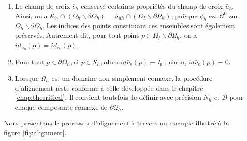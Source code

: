 \begin{remark}
\[\]
\vspace{-1cm}
\begin{enumerate}
\item Le champ de croix $\bar{v}_h$ conserve certaines propriétés du champ de croix $\bar{u}_h$. Ainsi, on a $\mathcal{S}_{\bar{v}_h}\cap(\Omega_h\backslash\partial\Omega_h)=\mathcal{S}_{\bar{u}h}\cap(\Omega_h\backslash\partial\Omega_h)$, puisque $\phi_h$ est $\mathcal{C}^0$ sur $\Omega_h\backslash\partial\Omega_h$. Les indices des points constituant ces ensembles sont également préservés. Autrement dit, pour tout point $p\in\Omega_h\backslash\partial\Omega_h$, on a $id_{\bar{u}_h}(p)=id_{\bar{v}_h}(p)$.
\item Pour tout $p\in\partial\Omega_h$, si $p\in\mathcal{S}_h$, alors $id{\bar{v}_h}(p)=I_p$ ; sinon, $id{\bar{v}_h}
(p)=0$.
\item Lorsque $\Omega_h$ est un domaine non simplement connexe, la procédure d'alignement reste conforme à celle développée dans le chapitre \ref{chap:theoritical}. Il convient toutefois de définir avec précision $\bar{N}_h$ et $\mathcal{B}$ pour chaque composante connexe de $\partial\Omega_h$.
\end{enumerate}
\end{remark}
Nous présentons le processus d'alignement à travers un exemple illustré à la figure \ref{fig:alignment}.

